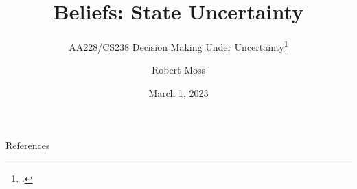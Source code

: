\documentclass[aspectratio=169]{beamer}
\title{Beliefs: State Uncertainty}
\subtitle{AA228/CS238 Decision Making Under Uncertainty\footcite{Kochenderfer2020}}
\author{Robert Moss}
\institute{Stanford University}
\date{March 1, 2023}
\begin{document}
\begin{frame}
    \maketitle
\end{frame}















% 
% 



% 

% 
% 
% 
% 
% 
% 
% 




\begin{frame}{References}
    \renewcommand*{\bibfont}{\scriptsize}
    \printbibliography
\end{frame}
\end{document}
